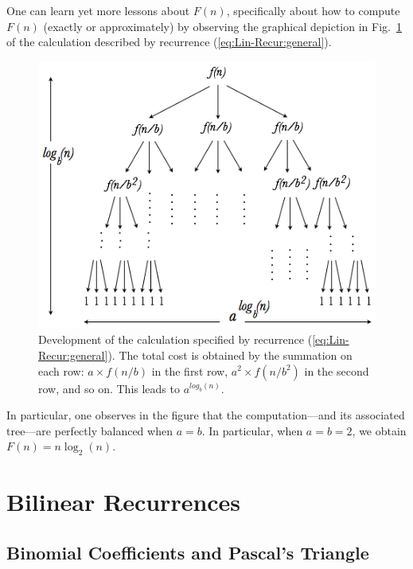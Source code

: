 One can learn yet more lessons about $F(n)$, specifically about how to
compute $F(n)$ (exactly or approximately) by observing the graphical
depiction in Fig.~\ref{fig:masterTheorem} of the calculation described
by recurrence (\ref{eq:Lin-Recur:general}).
\begin{figure}[htb]
\begin{center}
       \includegraphics[scale=0.4]{FiguresMaths/MasterTheoremgeneral}
\caption{Development of the calculation specified by recurrence
  (\ref{eq:Lin-Recur:general}).  The total cost is obtained by the summation on each row:
  $a \times f(n/b)$ in the first row, $a^2 \times f(n/b^2)$ in the second row, and so on.
  This leads to $a^{log_b(n)}$.
\label{fig:masterTheorem}}
\end{center}
\end{figure}
In particular, one observes in the figure that the computation---and
its associated tree---are perfectly balanced when $a=b$.  In
particular, when $a=b=2$, we obtain $F(n) = n \log_2(n)$.


\section{Bilinear Recurrences}
\label{sec:bilinear-recurrences}

\subsection{Binomial Coefficients and Pascal's Triangle}
\label{sec:binomial-coeff+Pascal}

